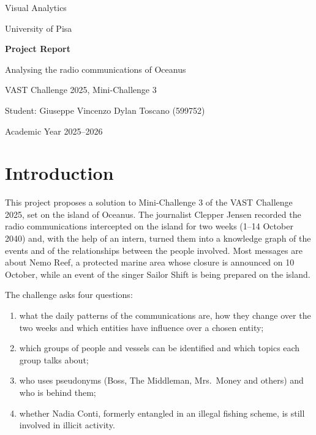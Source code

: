 \documentclass[11pt,a4paper]{article}
\begin{document}
\begin{titlepage}
\centering
\vspace*{3cm}
{\large Visual Analytics\par}
\vspace{0.4cm}
{\normalsize University of Pisa\par}
\vspace{2.5cm}
{\huge\bfseries Project Report\par}
\vspace{0.8cm}
{\large Analysing the radio communications of Oceanus\par}
\vspace{0.2cm}
{\large VAST Challenge 2025, Mini-Challenge 3\par}
\vfill
{\normalsize Student: Giuseppe Vincenzo Dylan Toscano (599752)\par}
\vspace{0.4cm}
{\normalsize Academic Year 2025--2026\par}
\vspace*{2.5cm}
\end{titlepage}

\tableofcontents
\newpage

\section{Introduction}
This project proposes a solution to Mini-Challenge 3 of the VAST Challenge 2025, set on the island of Oceanus.
The journalist Clepper Jensen recorded the radio communications intercepted on the island for two weeks
(1--14 October 2040) and, with the help of an intern, turned them into a knowledge graph of the events and of the
relationships between the people involved. Most messages are about Nemo Reef, a protected marine area whose closure
is announced on 10 October, while an event of the singer Sailor Shift is being prepared on the island.

The challenge asks four questions:
\begin{enumerate}
  \item what the daily patterns of the communications are, how they change over the two weeks and which entities
        have influence over a chosen entity;
  \item which groups of people and vessels can be identified and which topics each group talks about;
  \item who uses pseudonyms (Boss, The Middleman, Mrs.\ Money and others) and who is behind them;
  \item whether Nadia Conti, formerly entangled in an illegal fishing scheme, is still involved in illicit activity.
\end{enumerate}
\end{document}
